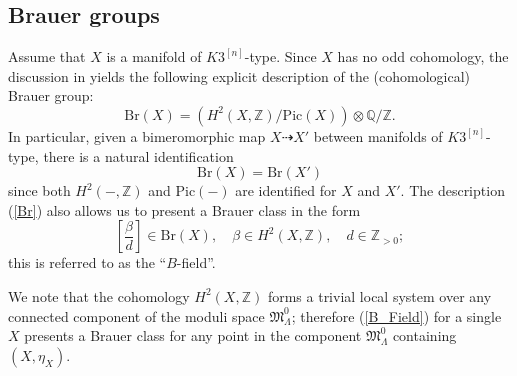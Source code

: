 \documentclass[11pt]{amsart}
\theoremstyle{plain}
\newtheorem{lem}[thm]{Lemma}
\theoremstyle{definition}
\theoremstyle{remark}
\newcommand{\BQ}{{\mathbb{Q}}}
\newcommand{\BZ}{{\mathbb{Z}}}
\newcommand{\FM}{{\mathfrak{M}}}
\begin{document}
\subsection{Brauer groups}

Assume that $X$ is a manifold of $K3^{[n]}$-type. Since $X$ has no odd cohomology, the discussion in \cite[Section 4.1]{Ca} yields the following explicit description of the (cohomological) Brauer group:
\begin{equation}\label{Br}
\mathrm{Br}(X) = \left( H^2(X, \BZ) / \mathrm{Pic}(X)\right) \otimes \BQ/\BZ.
\end{equation}
In particular, given a bimeromorphic map $X \dashrightarrow X'$ between manifolds of $K3^{[n]}$-type, there is a natural identification 
\[
\mathrm{Br}(X) = \mathrm{Br}(X')
\]
since both $H^2(-,\BZ)$ and $\mathrm{Pic}(-)$ are identified for $X$ and $X'$. The description (\ref{Br}) also allows us to present a Brauer class in the form
\begin{equation}\label{B_Field}
\left[ \frac{\beta}{d}\right] \in \mathrm{Br}(X), \quad \beta\in H^2(X,\BZ), \quad d\in \BZ_{> 0};
\end{equation}
this is referred to as the ``$B$-field''.%


We note that the cohomology $H^2(X, \BZ)$ forms a trivial local system over any connected component of the moduli space $\FM^0_{\Lambda}$; therefore (\ref{B_Field}) for a single $X$ presents a Brauer class for any point in the component $\FM^0_{\Lambda}$ containing $(X, \eta_X)$. 
\end{document}
